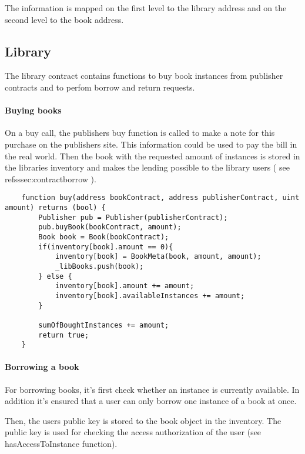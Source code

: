 The information is mapped on the first level to the library address and on the second level to the book address.

\subsection{Library}
The library contract contains functions to buy book instances from publisher contracts and to perfom borrow and return requests.

\paragraph*{Buying books}
On a buy call, the publishers buy function is called to make a note for this purchase on the publishers site. This information could be used to pay the bill in the real world.
Then the book with the requested amount of instances is stored in the libraries inventory and makes the lending possible to the library users ( see ref{sssec:contractborrow} ).

\begin{lstlisting}
	function buy(address bookContract, address publisherContract, uint amount) returns (bool) {
		Publisher pub = Publisher(publisherContract);
		pub.buyBook(bookContract, amount);
        Book book = Book(bookContract);
        if(inventory[book].amount == 0){
            inventory[book] = BookMeta(book, amount, amount);
		    _libBooks.push(book);
		} else {
            inventory[book].amount += amount;
            inventory[book].availableInstances += amount;
		}

		sumOfBoughtInstances += amount;
		return true;
	}
\end{lstlisting}


\paragraph*{Borrowing a book \label{sssec:contractborrow}}
For borrowing books, it's first check whether an instance is currently available. In addition it's ensured that a user can only borrow one instance of a book at once.

Then, the users public key is stored to the book object in the inventory. The public key is used for checking the access authorization of the user (see hasAccessToInstance function).

